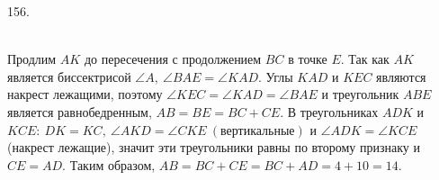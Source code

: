 156. \begin{figure}[ht!]
\end{figure}\\
Продлим $AK$ до пересечения с продолжением $BC$ в точке $E.$ Так как $AK$ является биссектрисой $\angle A,\ \angle BAE=\angle KAD.$ Углы $KAD$ и $KEC$ являются накрест лежащими, поэтому $\angle KEC=\angle KAD=\angle BAE$ и треугольник $ABE$ является равнобедренным, $AB=BE=BC+CE.$ В треугольниках $ADK$ и $KCE:\ DK=KC,\ \angle AKD=\angle CKE\ (\text{вертикальные})$ и $\angle ADK=\angle KCE$ (накрест лежащие), значит эти треугольники равны по второму признаку и $CE=AD.$ Таким образом, $AB=BC+CE=BC+AD=4+10=14.$\\
